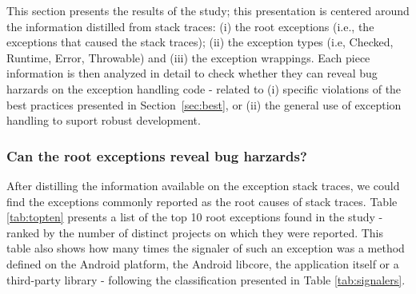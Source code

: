 This section presents the results of the study; this presentation is centered around 
the information distilled from stack traces: (i) the root exceptions (i.e., the exceptions that caused the stack traces);
 (ii) the exception types (i.e, Checked, Runtime, Error, Throwable) and (iii) the exception wrappings. 
Each piece information is then analyzed in detail to 
check whether they can reveal bug harzards on the exception handling code -
related to (i) specific violations of the best practices presented in Section~\ref{sec:best},
or (ii) the general use of exception handling to suport robust development.

\subsubsection{Can the root exceptions reveal bug harzards?}
After distilling the information available on the exception stack traces, we could find 
the exceptions commonly reported as the root causes of stack traces.
Table \ref{tab:topten} presents a list of the top 10 root exceptions found in the study - 
 ranked by the number of distinct projects on which they were reported. 
This table also shows how many times the signaler of such an exception was a method defined on
the Android platform, the Android libcore, the application itself or a third-party library -
 following the classification presented in Table  \ref{tab:signalers}. 

